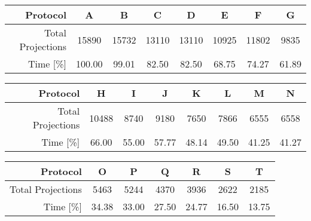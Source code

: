 \cbstart
\begin{table*}%
	\centering
	\label{tab:protocols}%
	\caption{Specification of different protocols and time used compared to gold standard. Protocol A corresponds to the Gold Standard, and would have been needed to cover the same FOV with 9 independent scans with a detector width of 1024 pixels (plus an overlap of 100 pixels), resulting in a number of projections $N_{A}=9(1024+100)\frac{\pi}{2}=15890$. Protocol B corresponds to the protocol shown in figure~\ref{subfig:protocolb}, resulting in a total number of projections of $N_{B}=3(3072+200)\frac{\pi}{2}=15419$.}%
	\begin{tabular*}{\textwidth}{r@{\extracolsep\fill}ccccccc}%
	\toprule%
		Protocol & A & B & C & D & E & F & G \\%
		\midrule%
		Total Projections & 15890 & 15732 & 13110 & 13110 & 10925 & 11802 & 9835 \\
		Time [\%] & 100.00 & 99.01 & 82.50 & 82.50 & 68.75 & 74.27 & 61.89 \\
		\bottomrule%
	\end{tabular*}%
	\begin{tabular*}{\textwidth}{r@{\extracolsep\fill}ccccccc}%
		Protocol & H & I & J & K & L & M & N \\%
		\midrule%
		Total Projections & 10488 & 8740 & 9180 & 7650 & 7866 & 6555 & 6558 \\
		Time [\%] & 66.00 & 55.00 & 57.77 & 48.14 & 49.50 & 41.25 & 41.27 \\
		\bottomrule%
	\end{tabular*}%
	\begin{tabular*}{\textwidth}{r@{\extracolsep\fill}cccccc}%
		Protocol & O & P & Q & R & S & T \\%
		\midrule%
		Total Projections & 5463 & 5244 & 4370 & 3936 & 2622 & 2185 \\
		Time [\%] & 34.38 & 33.00 & 27.50 & 24.77 & 16.50 & 13.75 \\
		\bottomrule%
	\end{tabular*}%
\end{table*}%
\cbend

